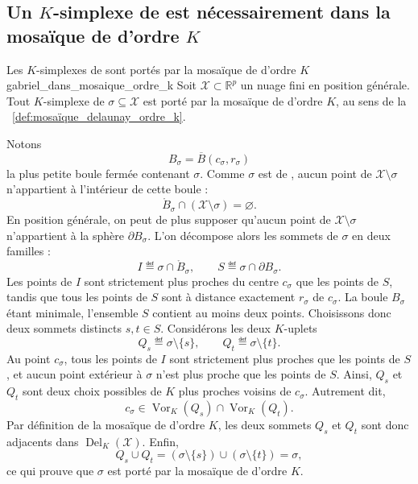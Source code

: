 \subsection{Un $K$-simplexe de  est nécessairement dans la mosaïque de  d'ordre $K$}

\begin{Theoreme}{Les $K$-simplexes de  sont portés par la mosaïque de  d'ordre $K$}{gabriel_dans_mosaique_ordre_k}
Soit $\mathcal X\subset\mathbb R^p$ un nuage fini en position générale.
Tout $K$-simplexe de  $\sigma\subseteq\mathcal X$ est porté par la mosaïque de  d'ordre $K$, au sens de la \Def~\ref{def:mosaïque_delaunay_ordre_k}.
\end{Theoreme}

\begin{Preuve} 
Notons
\[
    B_\sigma=\overline B(c_\sigma,r_\sigma)
\]
la plus petite boule fermée contenant $\sigma$.
Comme $\sigma$ est de , aucun point de $\mathcal X\setminus\sigma$ n'appartient à l'intérieur de cette boule :
\[
    \mathring B_\sigma\cap(\mathcal X\setminus\sigma)=\varnothing.
\]
En position générale, on peut de plus supposer qu'aucun point de $\mathcal X\setminus\sigma$ n'appartient à la sphère $\partial B_\sigma$.
L'on décompose alors les sommets de $\sigma$ en deux familles :
\[
    I \eqdef \sigma\cap \mathring B_\sigma,
    \qquad
    S \eqdef \sigma\cap \partial  B_\sigma.
\]
Les points de $I$ sont strictement plus proches du centre $c_\sigma$ que les points de $S$, tandis que tous les points de $S$ sont à distance exactement $r_\sigma$ de $c_\sigma$.
La boule $B_\sigma$ étant minimale, l'ensemble $S$ contient au moins deux points. Choisissons donc deux sommets distincts $s,t\in S$.
Considérons les deux $K$-uplets
\[
    Q_s \eqdef \sigma\setminus\{s\},
    \qquad
    Q_t \eqdef \sigma\setminus\{t\}.
\]
Au point $c_\sigma$, tous les points de $I$ sont strictement plus proches que les points de $S$, et aucun point extérieur à $\sigma$ n'est plus proche que les points de $S$.
Ainsi, $Q_s$ et $Q_t$ sont deux choix possibles de $K$ plus proches voisins de $c_\sigma$.
Autrement dit,
\[
    c_\sigma\in \operatorname{Vor}_K(Q_s)\cap \operatorname{Vor}_K(Q_t).
\]
Par définition de la mosaïque de  d'ordre $K$, les deux sommets $Q_s$ et $Q_t$ sont donc adjacents dans $\operatorname{Del}_K(\mathcal X)$.
Enfin,
\[
    Q_s\cup Q_t
    =
    (\sigma\setminus\{s\})\cup(\sigma\setminus\{t\})
    =
    \sigma,
\]
ce qui prouve que $\sigma$ est porté par la mosaïque de  d'ordre $K$.
\end{Preuve}

